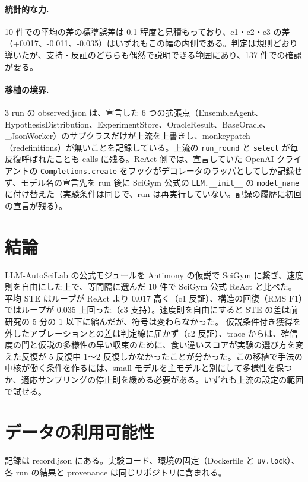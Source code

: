\documentclass{article}
\providecommand{\unverified}[1]{#1}
\providecommand{\airasrecordlink}[1]{#1}
\begin{document}
\paragraph{統計的な力.}
10 件での平均の差の標準誤差は 0.1 程度と見積もっており、c1・c2・c3 の差（\unverified{+0.017}、\unverified{-0.011}、\unverified{-0.035}）はいずれもこの幅の内側である。判定は規則どおり導いたが、支持・反証のどちらも偶然で説明できる範囲にあり、137 件での確認が要る。

\paragraph{移植の境界.}
3 run の observed.json は、宣言した 6 つの拡張点（EnsembleAgent、HypothesisDistribution、ExperimentStore、OracleResult、BaseOracle、\_JsonWorker）のサブクラスだけが上流を上書きし、monkeypatch（redefinitions）が無いことを記録している。上流の \texttt{run\_round} と \texttt{select} が毎反復呼ばれたことも calls に残る。ReAct 側では、宣言していた OpenAI クライアントの \texttt{Completions.create} をフックがデコレータのラッパとしてしか記録せず、モデル名の宣言先を run 後に SciGym 公式の \texttt{LLM.\_\_init\_\_} の \texttt{model\_name} に付け替えた（実験条件は同じで、run は再実行していない。記録の履歴に初回の宣言が残る）。

\section{結論}
\label{sec:conclusion}

LLM-AutoSciLab の公式モジュールを Antimony の仮説で SciGym に繋ぎ、速度則を自由にした上で、等間隔に選んだ 10 件で SciGym 公式 ReAct と比べた。平均 STE はループが ReAct より \unverified{0.017} 高く（c1 反証）、構造の回復（RMS F1）ではループが \unverified{0.035} 上回った（c3 支持）。速度則を自由にすると STE の差は前研究の 5 分の 1 以下に縮んだが、符号は変わらなかった。 仮説条件付き獲得を外したアブレーションとの差は判定線に届かず（c2 反証）、trace からは、確信度の門と仮説の多様性の早い収束のために、食い違いスコアが実験の選び方を変えた反復が 5 反復中 1〜2 反復しかなかったことが分かった。この移植で手法の中核が働く条件を作るには、small モデルを主モデルと別にして多様性を保つか、適応サンプリングの停止則を緩める必要がある。いずれも上流の設定の範囲で試せる。

\section*{データの利用可能性}
記録は \airasrecordlink{record.json} にある。実験コード、環境の固定（Dockerfile と \texttt{uv.lock}）、各 run の結果と provenance は同じリポジトリに含まれる。



\end{document}

